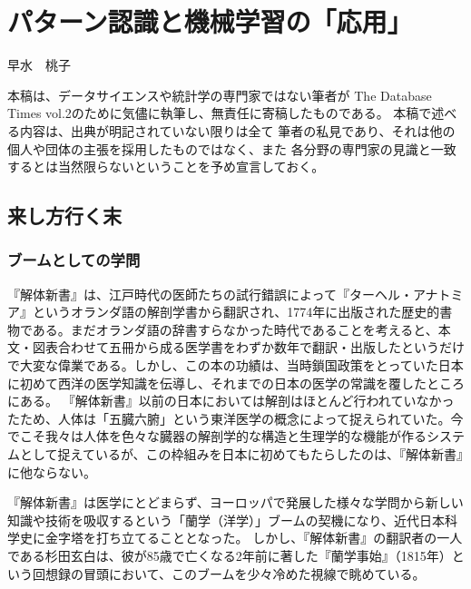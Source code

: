 
\chapter{パターン認識と機械学習の「応用」}

\begin{flushright}
 早水　桃子 %
\end{flushright}

\begin{spacing}{0.6}
\noindent
{\footnotesize{本稿は、データサイエンスや統計学の専門家ではない筆者が
The Database Times vol.2のために気儘に執筆し、無責任に寄稿したものである。
本稿で述べる内容は、出典が明記されていない限りは全て
筆者の私見であり、それは他の個人や団体の主張を採用したものではなく、また
各分野の専門家の見識と一致するとは当然限らないということを予め宣言しておく。}}
\end{spacing}
 
\section{来し方行く末}
\subsection{ブームとしての学問}
『解体新書』は、江戸時代の医師たちの試行錯誤によって『ターヘル・アナトミア』というオランダ語の解剖学書から翻訳され、1774年に出版された歴史的書物である。まだオランダ語の辞書すらなかった時代であることを考えると、本文・図表合わせて五冊から成る医学書をわずか数年で翻訳・出版したというだけで大変な偉業である。しかし、この本の功績は、当時鎖国政策をとっていた日本に初めて西洋の医学知識を伝導し、それまでの日本の医学の常識を覆したところにある。
『解体新書』以前の日本においては解剖はほとんど行われていなかったため、人体は「五臓六腑」という東洋医学の概念によって捉えられていた。今でこそ我々は人体を色々な臓器の解剖学的な構造と生理学的な機能が作るシステムとして捉えているが、この枠組みを日本に初めてもたらしたのは、『解体新書』に他ならない。

『解体新書』は医学にとどまらず、ヨーロッパで発展した様々な学問から新しい知識や技術を吸収するという「蘭学（洋学）」ブームの契機になり、近代日本科学史に金字塔を打ち立てることとなった。
しかし、『解体新書』の翻訳者の一人である杉田玄白は、彼が85歳で亡くなる2年前に著した『蘭学事始』（1815年）という回想録の冒頭において、このブームを少々冷めた視線で眺めている。

